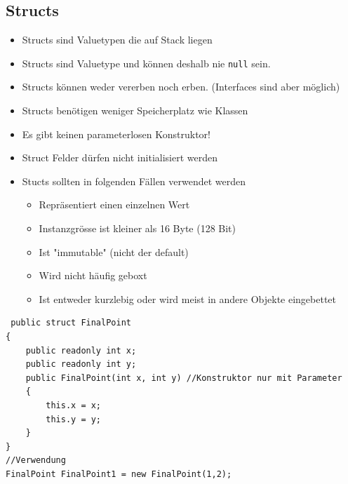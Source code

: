 \documentclass[
a4paper,
oneside,
10pt,
fleqn,
headsepline,
toc=listofnumbered, 
bibliography=totocnumbered]{scrartcl}
\begin{document}
\subsection{Structs}
\begin{itemize}
	\item Structs sind Valuetypen die auf Stack liegen
	\item Structs sind Valuetype und können deshalb nie \lstinline[]|null| sein.
	\item Structs können weder vererben noch erben. (Interfaces sind aber möglich)
	\item Structs benötigen weniger Speicherplatz wie Klassen
	\item Es gibt keinen parameterlosen Konstruktor!
	\item Struct Felder dürfen nicht initialisiert werden
	\item Stucts sollten in folgenden Fällen verwendet werden
	      \begin{itemize}
		      \item Repräsentiert einen einzelnen Wert
		      \item Instanzgrösse ist kleiner als 16 Byte (128 Bit)
		      \item Ist "immutable" (nicht der default)
		      \item Wird nicht häufig geboxt
		      \item Ist entweder kurzlebig oder wird meist in andere Objekte eingebettet
	      \end{itemize}
\end{itemize}
\begin{lstlisting}
 public struct FinalPoint
{
    public readonly int x;
    public readonly int y; 
    public FinalPoint(int x, int y) //Konstruktor nur mit Parameter
    {
        this.x = x;
        this.y = y;
    }
}
//Verwendung
FinalPoint FinalPoint1 = new FinalPoint(1,2);
\end{lstlisting}
\end{document}
